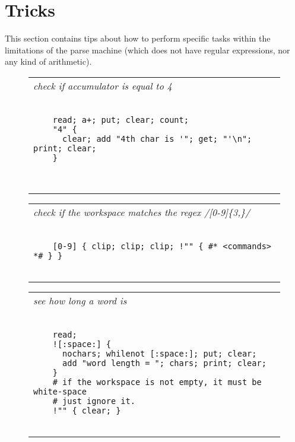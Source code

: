 \documentclass[a4paper,12pt]{article}
\begin{document}
\section{Tricks}

  This section contains tips about how to perform specific tasks
  within the limitations of the parse machine (which does not have
  regular expressions, nor any kind of arithmetic).
 \begin{figure}
 \begin{tabular}{ l }
 \emph{ check if accumulator is equal to 4 } \\ 
 \begin{lstlisting}[breaklines] 

    read; a+; put; clear; count; 
    "4" {  
      clear; add "4th char is '"; get; "'\n"; print; clear;
    }
    
  
 \end{lstlisting} 
 \end{tabular} 

 \end{figure}
 \begin{figure}
 \begin{tabular}{ l }
 \emph{ check if the workspace matches the regex /[0-9]\{3,\}/ } \\ 
 \begin{lstlisting}[breaklines] 

    [0-9] { clip; clip; clip; !"" { #* <commands> *# } }
  
 \end{lstlisting} 
 \end{tabular} 

 \end{figure}
 \begin{figure}
 \begin{tabular}{ l }
 \emph{ see how long a word is  } \\ 
 \begin{lstlisting}[breaklines] 

    read; 
    ![:space:] { 
      nochars; whilenot [:space:]; put; clear; 
      add "word length = "; chars; print; clear; 
    }
    # if the workspace is not empty, it must be white-space
    # just ignore it.
    !"" { clear; }
  
 \end{lstlisting} 
 \end{tabular} 

 \end{figure}
\end{document}
